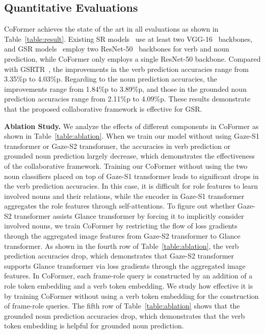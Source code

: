 \subsection{Quantitative Evaluations}
\mbox{CoFormer} achieves the state of the art in all evaluations as shown in Table~\ref{table:result}.
Existing SR models~\cite{mallya2017recurrent, li2017situation, suhail2019mixture, cooray2020attention} use at least two \mbox{VGG-16}~\cite{vggnet} backbones, and GSR models~\cite{pratt2020grounded} employ two \mbox{ResNet-50}~\cite{resnet} backbones for verb and noun prediction, while \mbox{CoFormer} only employs a single \mbox{ResNet-50} backbone. 
Compared with GSRTR~\cite{cho2021gsrtr},
the improvements in the verb prediction accuracies range from 3.35\%p to 4.03\%p.
Regarding to the noun prediction accuracies, 
the improvements range from 1.84\%p to 3.89\%p, and those in the grounded noun prediction accuracies range from 2.11\%p to 4.09\%p.
These results demonstrate that the proposed
collaborative framework is effective for GSR.

\noindent \textbf{Ablation Study.} 
We analyze the effects of different components in \mbox{CoFormer} as shown in Table~\ref{table:ablation}.
When we train our model without using \mbox{Gaze-S1} transformer or \mbox{Gaze-S2} transformer,
the accuracies in verb prediction or grounded noun prediction 
largely decrease, which demonstrates 
the effectiveness of the collaborative framework.
Training our \mbox{CoFormer} without using the two noun classifiers placed on top of \mbox{Gaze-S1} transformer leads to significant drops in the verb prediction accuracies.
In this case, it is difficult for role features to learn involved nouns and their relations, while the encoder in \mbox{Gaze-S1} transformer aggregates the role features through self-attentions.
To figure out whether \mbox{Gaze-S2} transformer assists Glance transformer by forcing it to implicitly consider involved nouns, we train \mbox{CoFormer} by restricting the flow of loss gradients through the aggregated image features from \mbox{Gaze-S2} transformer to Glance transformer.
As shown in the fourth row of Table~\ref{table:ablation}, the verb prediction accuracies drop, which demonstrates that \mbox{Gaze-S2} transformer supports Glance transformer via loss gradients through the aggregated image features. 
In \mbox{CoFormer}, each \mbox{frame-role} query is constructed by an addition of a role token embedding and a verb token embedding.
We study how effective it is by training \mbox{CoFormer} without using a verb token embedding for the construction of \mbox{frame-role} queries. 
The fifth row of Table~\ref{table:ablation} shows that the grounded noun prediction accuracies drop, 
which demonstrates that the verb token embedding is helpful for grounded noun prediction.

